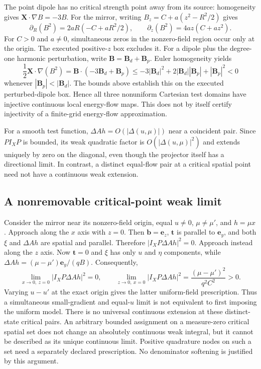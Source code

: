 \documentclass[11pt,letterpaper]{article}
\newcommand{\X}{\mathbf X}
\begin{document}
The point dipole has no critical strength point away from its source:
homogeneity gives $\X\cdot\nabla B=-3B$. For the mirror, writing
$B_z=C+a(z^2-R^2/2)$ gives
\begin{equation}
 \partial_R(B^2)=2aR(-C+aR^2/2),\qquad
 \partial_z(B^2)=4az(C+az^2).
\end{equation}
For $C>0$ and $a\ne0$, simultaneous zeros in the nonzero-field region occur
only at the origin. The executed positive-$z$ box excludes it.
For a dipole plus the degree-one harmonic perturbation, write
$\mathbf B=\mathbf B_d+\mathbf B_p$. Euler homogeneity yields
\begin{equation}
 \frac12\X\cdot\nabla(B^2)
 =\mathbf B\cdot(-3\mathbf B_d+\mathbf B_p)
 \le-3|\mathbf B_d|^2+2|\mathbf B_d||\mathbf B_p|+|\mathbf B_p|^2<0
\end{equation}
whenever $|\mathbf B_p|<|\mathbf B_d|$. The bounds above establish this on the
executed perturbed-dipole box. Hence all three nonuniform Cartesian test
domains have injective continuous local energy-flow maps. This does not by
itself certify injectivity of a finite-grid energy-flow approximation.

For a smooth test function, $\Delta Ah=O(|\Delta(u,\mu)|)$ near a coincident
pair. Since $P I_XP$ is bounded, its weak quadratic factor is
$O(|\Delta(u,\mu)|^2)$ and extends uniquely by zero on the diagonal, even
though the projector itself has a directional limit. In contrast, a
distinct equal-flow pair at a critical spatial point need not have a
continuous weak extension.

\subsection*{A nonremovable critical-point weak limit}
Consider the mirror near its nonzero-field origin, equal $u\ne0$,
$\mu\ne\mu'$, and $h=\mu x$. Approach along the $x$ axis with $z=0$.
Then $\mathbf b=\mathbf e_z$, $\mathbf t$ is parallel to $\mathbf e_y$,
and both $\xi$ and $\Delta Ah$ are spatial and parallel. Therefore
$|I_XP\Delta Ah|^2=0$. Approach instead along the $z$ axis. Now
$\mathbf t=0$ and $\xi$ has only $u$ and $\eta$ components, while
$\Delta Ah=(\mu-\mu')\mathbf e_y/(qB)$. Consequently,
\begin{equation}
 \lim_{x\to0,\ z=0}|I_XP\Delta Ah|^2=0,
 \qquad
 \lim_{z\to0,\ x=0}|I_XP\Delta Ah|^2
 =\frac{(\mu-\mu')^2}{q^2C^2}>0.
 \label{eq:criticalweaklimit}
\end{equation}
Varying $u-u'$ at the exact origin gives the latter uniform-field
prescription. Thus a simultaneous small-gradient and equal-$u$ limit is
not equivalent to first imposing the uniform model. There is no universal
continuous extension at these distinct-state critical pairs. An arbitrary
bounded assignment on a measure-zero critical spatial set does not change
an absolutely continuous weak integral, but it cannot be described as its
unique continuous limit. Positive quadrature nodes on such a set need a
separately declared prescription. No denominator softening is justified by
this argument.
\end{document}
